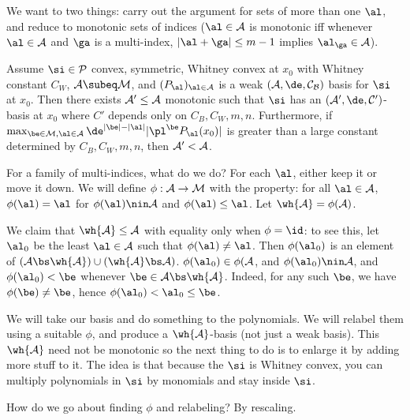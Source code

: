 
We want to two things: 
carry out the argument for sets of more than one $\al$, and reduce to monotonic sets of indices ($\al\in \cal A$ is monotonic iff whenever $\al\in \cal A$ and $\ga$ is a multi-index, $|\al+\ga|\le m-1$ implies $\al_\ga\in \cal A$).

\begin{lem}
Assume $\si\in \cal P$ convex, symmetric, Whitney convex at $x_0$ with Whitney constant $C_W$, $\cal A\subeq \cal M$, and $(P_\al)_{\al\in \cal A}$ is a weak $(\cal A,\de,C_B)$ basis for $\si$ at $x_0$. Then there exists $\cal A'\le \cal A$ monotonic such that $\si$ has an $(\cal A',\de,C')$-basis at $x_0$ where $C'$ depends only on $C_B,C_W,m,n$. Furthermore, if $\max_{\be\in \cal M, \al\in \cal A}\de^{|\be|-|\al|}|\pl^\be P_\al(x_0)|$ is greater than a large constant determined by $C_B,C_W,m,n$, then $\cal A'<\cal A$.
\end{lem}

For a family of multi-indices, what do we do? For each $\al$, either keep it or move it down.
We will define $\phi:\cal A\to \cal M$ with the property: 
for all $\al\in \cal A$, $\phi(\al)=\al$ for $\phi(\al)\nin \cal A$ and $\phi(\al)\le \al$. 
Let $\wh{\cal A} = \phi(\cal A)$.

We claim that $\wh{\cal A}\le \cal A$ with equality only when $\phi=\id$: to see this, let $\al_0$ be the least $\al\in \cal A$ such that $\phi(\al)\ne \al$. Then $\phi(\al_0)$ is an element of $(\cal A\bs \wh{\cal A})\cup (\wh{\cal A}\bs \cal A)$. $\phi(\al_0)\in \phi(\cal A$, and $\phi(\al_0)\nin \cal A$, and $\phi(\al_0)<\be$ whenever $\be\in \cal A\bs \wh{\cal A}$. Indeed, for any such $\be$, we have $\phi(\be)\ne \be$, hence $\phi(\al_0)<\al_0\le \be$.

We will take our basis and do something to the polynomials. We will relabel them using a suitable $\phi$, and produce a $\wh{\cal A}$-basis (not just a weak basis). This $\wh{\cal A}$ need not be monotonic so the next thing to do is to enlarge it by adding more stuff to it. The idea is that because the $\si$ is Whitney convex, you can multiply polynomials in $\si$ by %
monomials
and stay inside $\si$. 

How do we go about finding $\phi$ and relabeling? By rescaling.

